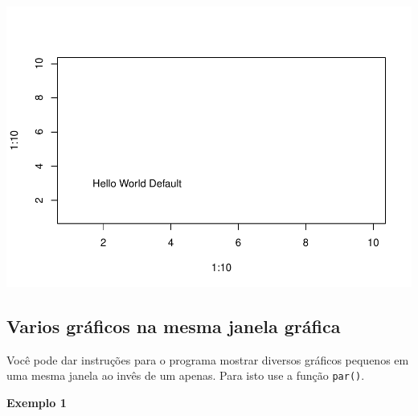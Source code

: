 \documentclass[
]{book}
\newenvironment{Shaded}{\begin{snugshade}}{\end{snugshade}}
\newcommand{\CommentTok}[1]{\textcolor[rgb]{0.56,0.35,0.01}{\textit{#1}}}
\newcommand{\DataTypeTok}[1]{\textcolor[rgb]{0.13,0.29,0.53}{#1}}
\newcommand{\DecValTok}[1]{\textcolor[rgb]{0.00,0.00,0.81}{#1}}
\newcommand{\KeywordTok}[1]{\textcolor[rgb]{0.13,0.29,0.53}{\textbf{#1}}}
\newcommand{\NormalTok}[1]{#1}
\newcommand{\OperatorTok}[1]{\textcolor[rgb]{0.81,0.36,0.00}{\textbf{#1}}}
\begin{document}
\includegraphics{TudodoR_files/figure-latex/unnamed-chunk-179-1.pdf}

\hypertarget{varios-gruxe1ficos-na-mesma-janela-gruxe1fica}{%
\subsection{Varios gráficos na mesma janela gráfica}\label{varios-gruxe1ficos-na-mesma-janela-gruxe1fica}}

Você pode dar instruções para o programa mostrar diversos gráficos pequenos em uma mesma janela ao invês de um apenas. Para isto use a função \texttt{par()}.

\textbf{Exemplo 1}

\begin{Shaded}
\end{Shaded}
\end{document}
